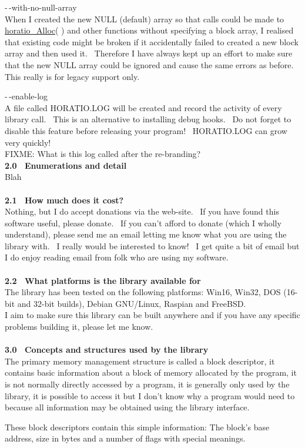 \documentclass{article}
\begin{document}
\par -$\,$-with-no-null-array\\
When I created the new NULL (default) array so that calls could be
made to \href{#Alloc}{horatio\_Alloc}( ) and other functions
without
specifying a block array, I realised that existing code might be broken
if it accidentally failed to created a new block array and then used
it.~
Therefore I have always kept up an effort to make sure that the new
NULL
array could be ignored and cause the same errors as before.~ This
really is for legacy support only.\\

\par -$\,$-enable-log
\\
A file called HORATIO.LOG will be created and record the activity of
every library call.~ This is an alternative to installing debug
hooks.~ Do not forget to disable this feature before releasing
your program!~ HORATIO.LOG can grow very quickly!\\
FIXME: What is this log called after the re-branding?
\\
\textbf{2.0~ Enumerations and detail}\\
Blah\\
\\
\textbf{2.1~ How much does it cost?}
\\
Nothing, but I do accept donations via the web-site.~ If you have
found this software useful, please donate.~ If you can't afford to
donate (which I wholly understand), please send me an email letting me
know what you are using the library with.~ I really would be
interested to know!~ I get quite a bit of email but I do enjoy
reading email from folk who are using my software.\\
\\
\textbf{2.2~ What platforms is the library available for}
\\
The library has been tested on the following platforms: Win16, Win32,
DOS (16-bit and 32-bit builds), Debian GNU/Linux, Raspian and FreeBSD.\\
I aim to make sure this library can be built anywhere and if you have
any specific problems building it, please let me know.\\
\\
\textbf{3.0~ Concepts and structures used by the library}
\\
The primary memory management structure is called a block descriptor,
it contains basic information about a block of memory allocated by the
program, it is not normally directly accessed by a program, it is
generally
only used by the library, it is possible to access it but I don't know
why a program would need to because all information may be obtained
using
the library interface.
\par These block descriptors contain this simple information: The block's
base address, size in bytes and a number of flags with special
meanings.
\end{document}
